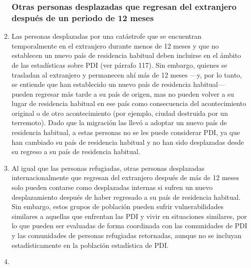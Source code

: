 \documentclass[
]{book}
\begin{document}
\begin{enumerate}
{  \subsubsection{Otras personas desplazadas que regresan del extranjero después de un periodo de 12 meses}\label{otras-personas-desplazadas-que-regresan-del-extranjero-despuuxe9s-de-un-periodo-de-12-meses}}
\item
  Las personas desplazadas por una catástrofe que se encuentran temporalmente en el extranjero durante menos de 12 meses y que no establecen un nuevo país de residencia habitual deben incluirse en el ámbito de las estadísticas sobre PDI (ver párrafo 117). Sin embargo, quienes se trasladan al extranjero y permanecen ahí más de 12 meses ---y, por lo tanto, se entiende que han establecido un nuevo país de residencia habitual--- pueden regresar más tarde a su país de origen, mas no pueden volver a su lugar de residencia habitual en ese país como consecuencia del acontecimiento original o de otro acontecimiento (por ejemplo, ciudad destruida por un terremoto). Dado que la migración las llevó a adoptar un nuevo país de residencia habitual, a estas personas no se les puede considerar PDI, ya que han cambiado su país de residencia habitual y no han sido desplazadas desde su regreso a su país de residencia habitual.
\item
  Al igual que las personas refugiadas, otras personas desplazadas internacionalmente que regresan del extranjero después de más de 12 meses solo pueden contarse como desplazadas internas si sufren un nuevo desplazamiento después de haber regresado a su país de residencia habitual. Sin embargo, estos grupos de población pueden sufrir vulnerabilidades similares a aquellas que enfrentan las PDI y vivir en situaciones similares, por lo que pueden ser evaluadas de forma coordinada con las comunidades de PDI y las comunidades de personas refugiadas retornadas, aunque no se incluyan estadísticamente en la población estadística de PDI.
\item ~
  \hypertarget{definiciuxf3n-de-la-poblaciuxf3n-estaduxedstica-y-de-flujos-de-pdi}{%
}
\end{enumerate}
\end{document}
